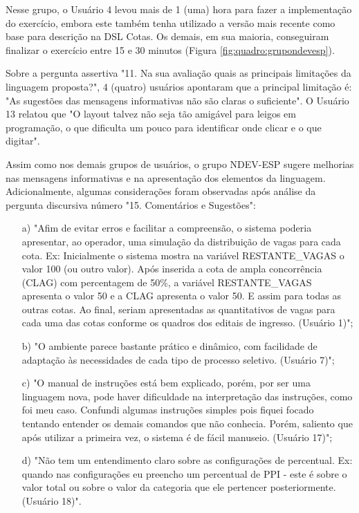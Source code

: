 

Nesse grupo, o Usuário 4 levou mais de 1 (uma) hora para fazer a implementação do exercício, embora este também tenha utilizado a versão mais recente como base para descrição na DSL Cotas. Os demais, em sua maioria, conseguiram finalizar o exercício entre 15 e 30 minutos (Figura \ref{fig:quadro:grupondevesp}).



Sobre a pergunta assertiva "11. Na sua avaliação quais as principais limitações da linguagem proposta?", 4 (quatro) usuários apontaram que a principal limitação é: "As sugestões das mensagens informativas não são claras o suficiente". O Usuário 13 relatou que "O layout talvez não seja tão amigável para leigos em programação, o que dificulta um pouco para identificar onde clicar e o que digitar".

Assim como nos demais grupos de usuários, o grupo NDEV-ESP sugere melhorias nas mensagens informativas e na apresentação dos elementos da linguagem. Adicionalmente, algumas considerações foram observadas após análise da pergunta discursiva número "15. Comentários e Sugestões":

\begin{enumerate}
    \item [a)] "Afim de evitar erros e facilitar a compreensão, o sistema poderia apresentar, ao operador, uma simulação da distribuição de vagas para cada cota. Ex: Inicialmente o sistema mostra na variável RESTANTE\_VAGAS o valor 100 (ou outro valor). Após inserida a cota de ampla concorrência (CLAG) com percentagem de 50\%, a variável RESTANTE\_VAGAS apresenta o valor 50 e a CLAG apresenta o valor 50. E assim para todas as outras cotas. Ao final, seriam apresentadas as quantitativos de vagas para cada uma das cotas conforme os quadros dos editais de ingresso. (Usuário 1)";
    \item [b)] "O ambiente parece bastante prático e dinâmico, com facilidade de adaptação às necessidades de cada tipo de processo seletivo. (Usuário 7)";    
    \item [c)] "O manual de instruções está bem explicado, porém, por ser uma linguagem nova, pode haver dificuldade na interpretação das instruções, como foi meu caso. Confundi algumas instruções simples pois fiquei focado tentando entender os demais comandos que não conhecia. Porém, saliento que após utilizar a primeira vez, o sistema é de fácil manuseio. (Usuário 17)";   
    \item [d)] "Não tem um entendimento claro sobre as configurações de percentual. Ex: quando nas configurações eu preencho um percentual de PPI -  este é sobre o valor total ou sobre o valor da categoria que ele pertencer posteriormente. (Usuário 18)".
\end{enumerate}

